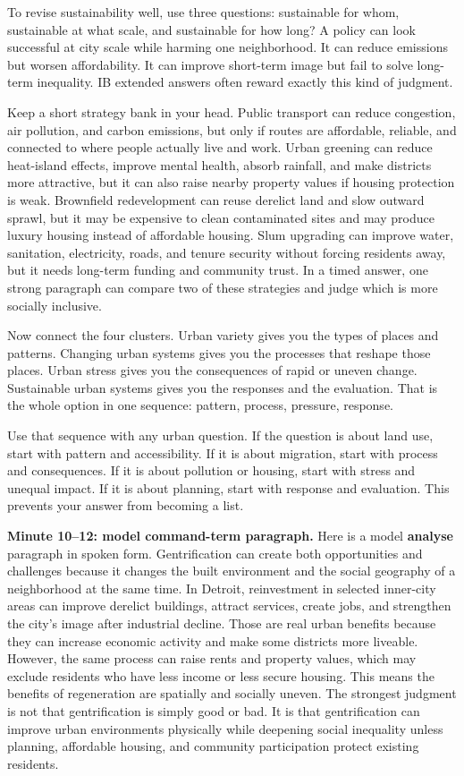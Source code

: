 \documentclass[11pt,a4paper]{article}
\newcommand{\exam}[1]{\textcolor{AccentTeal}{\textbf{#1}}}
\begin{document}
To revise sustainability well, use three questions: sustainable for whom,
sustainable at what scale, and sustainable for how long? A policy can look
successful at city scale while harming one neighborhood. It can reduce emissions
but worsen affordability. It can improve short-term image but fail to solve
long-term inequality. IB extended answers often reward exactly this kind of
judgment.

Keep a short strategy bank in your head. Public transport can reduce congestion,
air pollution, and carbon emissions, but only if routes are affordable,
reliable, and connected to where people actually live and work. Urban greening
can reduce heat-island effects, improve mental health, absorb rainfall, and
make districts more attractive, but it can also raise nearby property values if
housing protection is weak. Brownfield redevelopment can reuse derelict land and
slow outward sprawl, but it may be expensive to clean contaminated sites and may
produce luxury housing instead of affordable housing. Slum upgrading can improve
water, sanitation, electricity, roads, and tenure security without forcing
residents away, but it needs long-term funding and community trust. In a timed
answer, one strong paragraph can compare two of these strategies and judge which
is more socially inclusive.

Now connect the four clusters. Urban variety gives you the types of places and
patterns. Changing urban systems gives you the processes that reshape those
places. Urban stress gives you the consequences of rapid or uneven change.
Sustainable urban systems gives you the responses and the evaluation. That is
the whole option in one sequence: pattern, process, pressure, response.

Use that sequence with any urban question. If the question is about land use,
start with pattern and accessibility. If it is about migration, start with
process and consequences. If it is about pollution or housing, start with stress
and unequal impact. If it is about planning, start with response and evaluation.
This prevents your answer from becoming a list.

\textbf{Minute 10--12: model command-term paragraph.}
Here is a model \exam{analyse} paragraph in spoken form. Gentrification can
create both opportunities and challenges because it changes the built
environment and the social geography of a neighborhood at the same time. In
Detroit, reinvestment in selected inner-city areas can improve derelict
buildings, attract services, create jobs, and strengthen the city's image after
industrial decline. Those are real urban benefits because they can increase
economic activity and make some districts more liveable. However, the same
process can raise rents and property values, which may exclude residents who
have less income or less secure housing. This means the benefits of regeneration
are spatially and socially uneven. The strongest judgment is not that
gentrification is simply good or bad. It is that gentrification can improve
urban environments physically while deepening social inequality unless planning,
affordable housing, and community participation protect existing residents.
\end{document}
